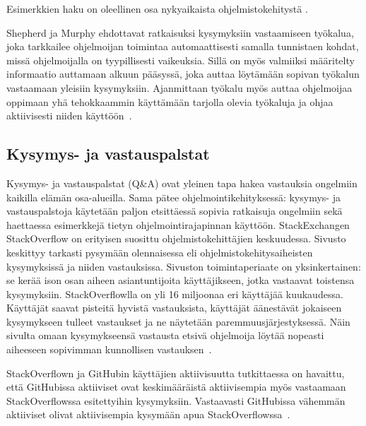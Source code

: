 \documentclass[finnish]{tktltiki2}
\theoremstyle{definition}
\theoremstyle{remark}
\begin{document}
Esimerkkien haku on oleellinen osa nykyaikaista ohjelmistokehitystä \cite{example-overflow-social-media-for-code-recommendations}.


Shepherd ja Murphy ehdottavat ratkaisuksi kysymyksiin vastaamiseen työkalua, joka tarkkailee ohjelmoijan toimintaa automaattisesti samalla tunnistaen kohdat, missä ohjelmoijalla on tyypillisesti vaikeuksia. Sillä on myös valmiiksi määritelty informaatio auttamaan alkuun pääsyssä, joka auttaa löytämään sopivan työkalun vastaamaan yleisiin kysymyksiin. Ajanmittaan työkalu myös auttaa ohjelmoijaa oppimaan yhä tehokkaammin käyttämään tarjolla olevia työkaluja ja ohjaa aktiivisesti niiden käyttöön~\cite{programmers-coach}.

\subsection{Kysymys- ja vastauspalstat}
Kysymys- ja vastauspalstat (Q\&A) ovat yleinen tapa hakea vastauksia ongelmiin kaikilla elämän osa-alueilla. Sama pätee ohjelmointikehityksessä: kysymys- ja vastauspalstoja käytetään paljon etsittäessä sopivia ratkaisuja ongelmiin sekä haettaessa esimerkkejä tietyn ohjelmointirajapinnan käyttöön. StackExchangen StackOverflow on erityisen suosittu ohjelmistokehittäjien keskuudessa. Sivusto keskittyy tarkasti pysymään olennaisessa eli ohjelmistokehitysaiheisten kysymyksissä ja niiden vastauksissa. Sivuston toimintaperiaate on yksinkertainen: se kerää ison osan aiheen asiantuntijoita käyttäjikseen, jotka vastaavat toistensa kysymyksiin. StackOverflowlla on yli 16 miljoonaa eri käyttäjää kuukaudessa. Käyttäjät saavat pisteitä hyvistä vastauksista, käyttäjät äänestävät jokaiseen kysymykseen tulleet vastaukset ja ne näytetään paremmuusjärjestyksessä. Näin sivulta omaan kysymykseensä vastausta etsivä ohjelmoija löytää nopeasti aiheeseen sopivimman kunnollisen vastauksen~\cite{social-networking-meets-se}.

StackOverflown ja GitHubin käyttäjien aktiivisuutta tutkittaessa on havaittu, että GitHubissa aktiiviset ovat keskimääräistä aktiivisempia myös vastaamaan StackOverflowssa esitettyihin kysymyksiin. Vastaavasti GitHubissa vähemmän aktiiviset olivat aktiivisempia kysymään apua StackOverflowssa~\cite{stackoverflow-and-github}.
\end{document}
